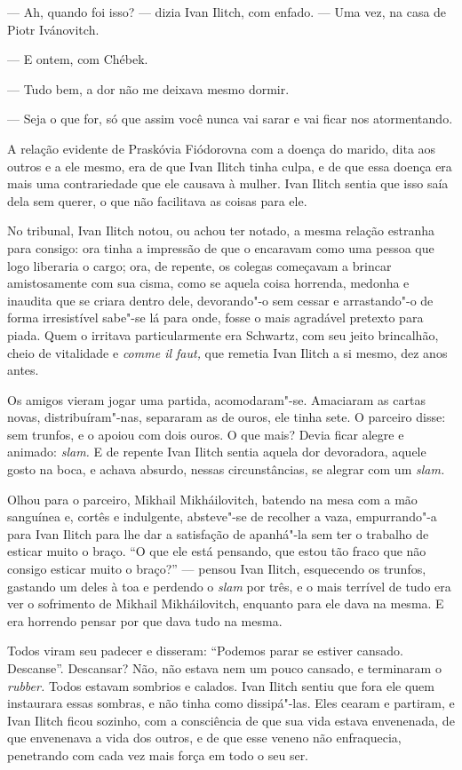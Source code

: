--- Ah, quando foi isso? --- dizia Ivan Ilitch, com enfado. --- Uma vez, na
casa de Piotr Ivánovitch.

--- E ontem, com Chébek.

--- Tudo bem, a dor não me deixava mesmo dormir.

--- Seja o que for, só que assim você nunca vai sarar e vai ficar nos
atormentando.

A relação evidente de Praskóvia Fiódorovna com a doença do marido, dita
aos outros e a ele mesmo, era de que Ivan Ilitch tinha culpa, e de que
essa doença era mais uma contrariedade que ele causava à mulher. Ivan
Ilitch sentia que isso saía dela sem querer, o que não facilitava as
coisas para ele.

No tribunal, Ivan Ilitch notou, ou achou ter notado, a mesma relação
estranha para consigo: ora tinha a impressão de que o encaravam como uma
pessoa que logo liberaria o cargo; ora, de repente, os colegas começavam
a brincar amistosamente com sua cisma, como se aquela coisa horrenda,
medonha e inaudita que se criara dentro dele, devorando"-o sem cessar e
arrastando"-o de forma irresistível sabe"-se lá para onde, fosse o mais
agradável pretexto para piada. Quem o irritava particularmente era
Schwartz, com seu jeito brincalhão, cheio de vitalidade e \emph{comme il
faut,} que remetia Ivan Ilitch a si mesmo, dez anos antes.

Os amigos vieram jogar uma partida, acomodaram"-se. Amaciaram as cartas
novas, distribuíram"-nas, separaram as de ouros, ele tinha sete. O
parceiro disse: sem trunfos, e o apoiou com dois ouros. O que mais?
Devia ficar alegre e animado: \emph{slam.} E de repente Ivan Ilitch
sentia aquela dor devoradora, aquele gosto na boca, e achava absurdo,
nessas circunstâncias, se alegrar com um \emph{slam.}

Olhou para o parceiro, Mikhail Mikháilovitch, batendo na mesa com a mão
sanguínea e, cortês e indulgente, absteve"-se de recolher a vaza,
empurrando"-a para Ivan Ilitch para lhe dar a satisfação de apanhá"-la sem
ter o trabalho de esticar muito o braço. ``O que ele está pensando, que
estou tão fraco que não consigo esticar muito o braço?'' --- pensou Ivan
Ilitch, esquecendo os trunfos, gastando um deles à toa e perdendo o
\emph{slam} por três, e o mais terrível de tudo era ver o sofrimento de
Mikhail Mikháilovitch, enquanto para ele dava na mesma. E era horrendo
pensar por que dava tudo na mesma.

Todos viram seu padecer e disseram: ``Podemos parar se estiver cansado.
Descanse''. Descansar? Não, não estava nem um pouco cansado, e
terminaram o \emph{rubber.} Todos estavam sombrios e calados. Ivan
Ilitch sentiu que fora ele quem instaurara essas sombras, e não tinha
como dissipá"-las. Eles cearam e partiram, e Ivan Ilitch ficou sozinho,
com a consciência de que sua vida estava envenenada, de que envenenava a
vida dos outros, e de que esse veneno não enfraquecia, penetrando com
cada vez mais força em todo o seu ser.

